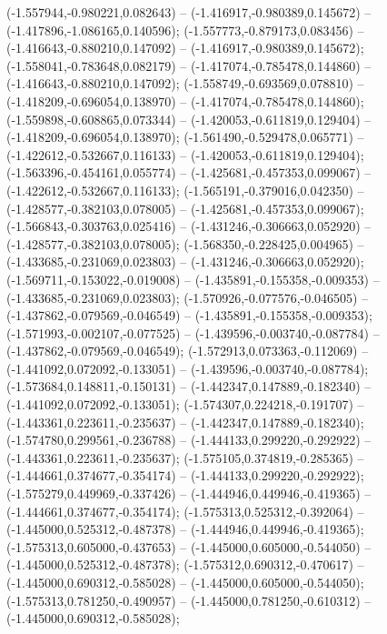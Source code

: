  (-1.557944,-0.980221,0.082643) -- (-1.416917,-0.980389,0.145672) -- (-1.417896,-1.086165,0.140596);
 (-1.557773,-0.879173,0.083456) -- (-1.416643,-0.880210,0.147092) -- (-1.416917,-0.980389,0.145672);
 (-1.558041,-0.783648,0.082179) -- (-1.417074,-0.785478,0.144860) -- (-1.416643,-0.880210,0.147092);
 (-1.558749,-0.693569,0.078810) -- (-1.418209,-0.696054,0.138970) -- (-1.417074,-0.785478,0.144860);
 (-1.559898,-0.608865,0.073344) -- (-1.420053,-0.611819,0.129404) -- (-1.418209,-0.696054,0.138970);
 (-1.561490,-0.529478,0.065771) -- (-1.422612,-0.532667,0.116133) -- (-1.420053,-0.611819,0.129404);
 (-1.563396,-0.454161,0.055774) -- (-1.425681,-0.457353,0.099067) -- (-1.422612,-0.532667,0.116133);
 (-1.565191,-0.379016,0.042350) -- (-1.428577,-0.382103,0.078005) -- (-1.425681,-0.457353,0.099067);
 (-1.566843,-0.303763,0.025416) -- (-1.431246,-0.306663,0.052920) -- (-1.428577,-0.382103,0.078005);
 (-1.568350,-0.228425,0.004965) -- (-1.433685,-0.231069,0.023803) -- (-1.431246,-0.306663,0.052920);
 (-1.569711,-0.153022,-0.019008) -- (-1.435891,-0.155358,-0.009353) -- (-1.433685,-0.231069,0.023803);
 (-1.570926,-0.077576,-0.046505) -- (-1.437862,-0.079569,-0.046549) -- (-1.435891,-0.155358,-0.009353);
 (-1.571993,-0.002107,-0.077525) -- (-1.439596,-0.003740,-0.087784) -- (-1.437862,-0.079569,-0.046549);
 (-1.572913,0.073363,-0.112069) -- (-1.441092,0.072092,-0.133051) -- (-1.439596,-0.003740,-0.087784);
 (-1.573684,0.148811,-0.150131) -- (-1.442347,0.147889,-0.182340) -- (-1.441092,0.072092,-0.133051);
 (-1.574307,0.224218,-0.191707) -- (-1.443361,0.223611,-0.235637) -- (-1.442347,0.147889,-0.182340);
 (-1.574780,0.299561,-0.236788) -- (-1.444133,0.299220,-0.292922) -- (-1.443361,0.223611,-0.235637);
 (-1.575105,0.374819,-0.285365) -- (-1.444661,0.374677,-0.354174) -- (-1.444133,0.299220,-0.292922);
 (-1.575279,0.449969,-0.337426) -- (-1.444946,0.449946,-0.419365) -- (-1.444661,0.374677,-0.354174);
 (-1.575313,0.525312,-0.392064) -- (-1.445000,0.525312,-0.487378) -- (-1.444946,0.449946,-0.419365);
 (-1.575313,0.605000,-0.437653) -- (-1.445000,0.605000,-0.544050) -- (-1.445000,0.525312,-0.487378);
 (-1.575312,0.690312,-0.470617) -- (-1.445000,0.690312,-0.585028) -- (-1.445000,0.605000,-0.544050);
 (-1.575313,0.781250,-0.490957) -- (-1.445000,0.781250,-0.610312) -- (-1.445000,0.690312,-0.585028);
